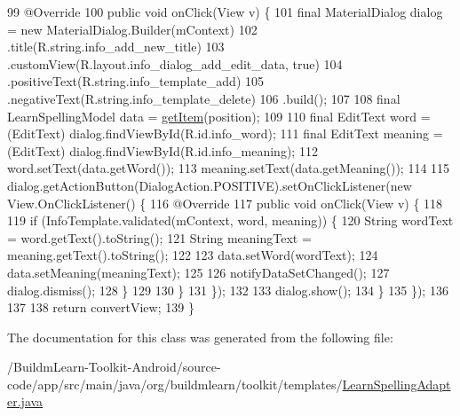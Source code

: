\begin{DoxyCode}
99             @Override
100             \textcolor{keyword}{public} \textcolor{keywordtype}{void} onClick(View v) \{
101                 \textcolor{keyword}{final} MaterialDialog dialog = \textcolor{keyword}{new} MaterialDialog.Builder(mContext)
102                         .title(R.string.info\_add\_new\_title)
103                         .customView(R.layout.info\_dialog\_add\_edit\_data, \textcolor{keyword}{true})
104                         .positiveText(R.string.info\_template\_add)
105                         .negativeText(R.string.info\_template\_delete)
106                         .build();
107 
108                 \textcolor{keyword}{final} LearnSpellingModel data = \hyperlink{classorg_1_1buildmlearn_1_1toolkit_1_1templates_1_1LearnSpellingAdapter_af0b0934c215c709326ded3e7fc3b56aa}{getItem}(position);
109 
110                 \textcolor{keyword}{final} EditText word = (EditText) dialog.findViewById(R.id.info\_word);
111                 \textcolor{keyword}{final} EditText meaning = (EditText) dialog.findViewById(R.id.info\_meaning);
112                 word.setText(data.getWord());
113                 meaning.setText(data.getMeaning());
114 
115                 dialog.getActionButton(DialogAction.POSITIVE).setOnClickListener(\textcolor{keyword}{new} View.OnClickListener()
       \{
116                     @Override
117                     \textcolor{keyword}{public} \textcolor{keywordtype}{void} onClick(View v) \{
118 
119                         \textcolor{keywordflow}{if} (InfoTemplate.validated(mContext, word, meaning)) \{
120                             String wordText = word.getText().toString();
121                             String meaningText = meaning.getText().toString();
122 
123                             data.setWord(wordText);
124                             data.setMeaning(meaningText);
125 
126                             notifyDataSetChanged();
127                             dialog.dismiss();
128                         \}
129 
130                     \}
131                 \});
132 
133                 dialog.show();
134             \}
135         \});
136 
137 
138         \textcolor{keywordflow}{return} convertView;
139     \}
\end{DoxyCode}


The documentation for this class was generated from the following file\-:\begin{DoxyCompactItemize}
\item 
/\-Buildm\-Learn-\/\-Toolkit-\/\-Android/source-\/code/app/src/main/java/org/buildmlearn/toolkit/templates/\hyperlink{LearnSpellingAdapter_8java}{Learn\-Spelling\-Adapter.\-java}\end{DoxyCompactItemize}
